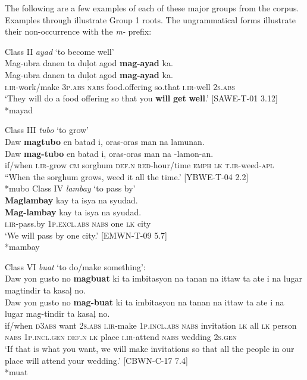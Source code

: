 The following are a few examples of each of these major groups from the corpus. Examples  through  illustrate Group 1 roots. The ungrammatical forms illustrate their non-occurrence with the \textit{m-} prefix:

\ea
Class II \textit{ayad} ‘to become well’ \\
\label{ex:tobecomewell}
Mag-ubra  danen  ta  duļot  agod  \textbf{mag-ayad}  ka. \\\smallskip
\gll Mag-ubra  danen  ta  duļot  agod  \textbf{mag-ayad}  ka. \\
\textsc{i.ir}-work/make  3\textsc{p.abs}  \textsc{nabs}  food.offering  so.that  \textsc{i.ir}-well  2\textsc{s.abs} \\
\glt ‘They will do a food offering so that you \textbf{will} \textbf{get} \textbf{well}.’ [SAWE-T-01 3.12] \\\smallskip
*mayad
\z

\ea
Class III \textit{tubo} ‘to grow’ \\
Daw  \textbf{magtubo}  en  batad  i,  oras-oras  man  na  lamunan. \\\smallskip
\gll Daw  \textbf{mag-tubo}  en  batad  i,  oras-oras  man  na  \emptyset{}-lamon-an. \\
if/when  \textsc{i.ir}-grow  \textsc{cm}  sorghum  \textsc{def.n}  \textsc{red}-hour/time  \textsc{emph}  \textsc{lk}  \textsc{t.ir}-weed-\textsc{apl} \\
\glt “When the sorghum grows, weed it all the time.’ [YBWE-T-04 2.2] \\\smallskip
*mubo
\z
\ea
Class IV \textit{lambay} ‘to pass by’ \\
\textbf{Maglambay}  kay  ta  isya  na  syudad. \\\smallskip
\gll \textbf{Mag-lambay}  kay  ta  isya  na  syudad. \\
\textsc{i.ir}-pass.by  1\textsc{p.excl.abs}  \textsc{nabs}  one  \textsc{lk}  city \\
\glt ‘We will pass by one city.’ [EMWN-T-09 5.7] \\\smallskip
*mambay
\z


\ea
Class VI \textit{buat} ‘to do/make something’: \\
Daw  yon  gusto  no  \textbf{magbuat}  ki  ta  imbitasyon  na tanan  na  ittaw  ta  ate  i  na  lugar  magtindir  ta  kasaļ  no. \\\smallskip
\gll Daw  yon  gusto  no  \textbf{mag-buat}  ki  ta  imbitasyon  na tanan  na  ittaw  ta  ate  i  na  lugar  mag-tindir  ta  kasaļ  no. \\
if/when  \textsc{d}3\textsc{abs}  want  2\textsc{s.abs}  \textsc{i.ir}-make  1\textsc{p.incl.abs}  \textsc{nabs}   invitation  \textsc{lk}
all  \textsc{lk}  person  \textsc{nabs}  1\textsc{p.incl.gen}  \textsc{def.n}  \textsc{lk}  place  \textsc{i.ir}-attend  \textsc{nabs}  wedding  2\textsc{s.gen} \\
\glt ‘If that is what you want, we will make invitations so that all the people in our place will attend your wedding.’ [CBWN-C-17 7.4] \\\smallskip
*muat
\z


